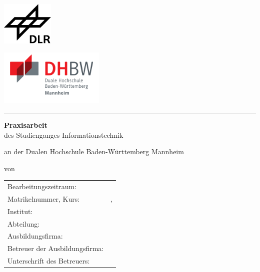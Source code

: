 \begin{titlepage}

	\begin{minipage}{.45\textwidth}
		\includegraphics[width=2.5cm]{img/Logo_DLR.pdf}
	\end{minipage}
	\hfill
	\begin{minipage}{.45\textwidth}
		\begin{flushright}
			\includegraphics[height = 2.7cm]{img/DHBW_Logo.pdf}
		\end{flushright}
	\end{minipage}
	
	\rule{.95\textwidth}{.5pt}
	
	\vspace{1.5cm}
	
	\centering
	
	\Large{\textbf{\themaA}}
	\vspace{1.5cm}
					
	
	\large{\textbf{Praxisarbeit}} \\
	\vspace{0.3cm}
	\normalsize
	\vspace{0.3cm}
	des Studienganges Informationstechnik \\
	\vspace{0.3cm}

	an der Dualen Hochschule Baden-Württemberg Mannheim \\

	\vspace{1.5cm}

	von\\
	\large{\autor}
	\vspace{2.5cm}
	
	\vfill
		

	\small
	\begin{tabularx}{\linewidth}{@{}lX@{}}
		\hline
		Bearbeitungszeitraum: & \praxisA \\
		Matrikelnummer, Kurs: & \matrikelnr, \jahrgang\\
		Institut: & \institut\\
		Abteilung: & \abteilung \\
		Ausbildungsfirma: & \dlr\\
		Betreuer der Ausbildungsfirma: & \betreuerdlr\\
		Unterschrift des Betreuers:
	\end{tabularx}		
\end{titlepage}
